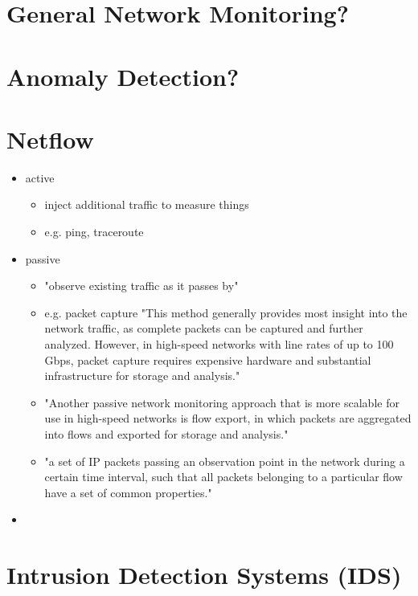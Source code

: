 
\section{General Network Monitoring?}

\section{Anomaly Detection?}

\section{Netflow}
\begin{itemize}
	\item active
		\begin{itemize}
			\item inject additional traffic to measure things \parencite{Hofstede2014}
			\item e.g. ping, traceroute
		\end{itemize}
	\item passive
		\begin{itemize}
			\item "observe existing traffic as it passes by" \parencite{Hofstede2014}
			\item e.g. packet capture "This method generally provides most insight into the network traffic, as complete packets can be captured and further analyzed. However, in high-speed networks with line rates of up to 100 Gbps, packet capture requires expensive hardware and substantial infrastructure for storage and analysis." \parencite{Hofstede2014}
			\item "Another passive network monitoring approach that is more scalable for use in high-speed networks is flow export, in which packets are aggregated into flows and exported for storage and analysis." \parencite{Hofstede2014}
			\item  "a set of IP packets passing an observation point in the network during a certain time interval, such that all packets belonging to a particular flow have a set of common properties." \parencite{Claise2013}
			
		\end{itemize}
	\item 
\end{itemize}

\section{Intrusion Detection Systems (IDS)}
